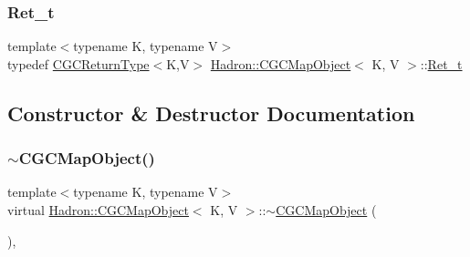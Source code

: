 \mbox{\label{classHadron_1_1CGCMapObject_a154c1c2b41f7dad9d5692b4d2c6f5a2c}} 
\subsubsection{\texorpdfstring{Ret\_t}{Ret\_t}\hspace{0.1cm}{\footnotesize\ttfamily [2/2]}}
{\footnotesize\ttfamily template$<$typename K, typename V$>$ \\
typedef \mbox{\hyperlink{structHadron_1_1CGCReturnType}{C\+G\+C\+Return\+Type}}$<$K,V$>$ \mbox{\hyperlink{classHadron_1_1CGCMapObject}{Hadron\+::\+C\+G\+C\+Map\+Object}}$<$ K, V $>$\+::\mbox{\hyperlink{classHadron_1_1CGCMapObject_a154c1c2b41f7dad9d5692b4d2c6f5a2c}{Ret\+\_\+t}}}



\subsection{Constructor \& Destructor Documentation}
\mbox{\label{classHadron_1_1CGCMapObject_aee79d26f143bad748680b674763b831f}} 
\subsubsection{\texorpdfstring{$\sim$CGCMapObject()}{~CGCMapObject()}\hspace{0.1cm}{\footnotesize\ttfamily [1/2]}}
{\footnotesize\ttfamily template$<$typename K, typename V$>$ \\
virtual \mbox{\hyperlink{classHadron_1_1CGCMapObject}{Hadron\+::\+C\+G\+C\+Map\+Object}}$<$ K, V $>$\+::$\sim$\mbox{\hyperlink{classHadron_1_1CGCMapObject}{C\+G\+C\+Map\+Object}} (\begin{DoxyParamCaption}{ }\end{DoxyParamCaption})\hspace{0.3cm}{\ttfamily [inline]}, {\ttfamily [virtual]}}



